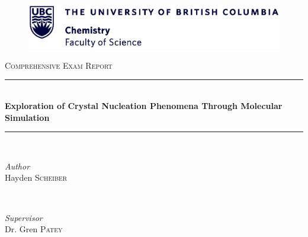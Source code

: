 
\begin{titlepage} %
	\newcommand{\HRule}{\rule{\linewidth}{0.5mm}} %
	
	\center %
	\begin{figure}
		\centering
		\includegraphics[width=\textwidth]{figures/UBC_Chemlogo.eps}
	\end{figure}
	
	
	
	\textsc{\LARGE Comprehensive Exam Report}\\[1.5cm] %
	
	
	
	\HRule\\[0.4cm]
	
	{\huge\bfseries Exploration of Crystal Nucleation Phenomena Through Molecular Simulation}\\[0.4cm] %
	
	\HRule\\[1.5cm]
	
	
	\begin{minipage}{0.4\textwidth}
		\begin{flushleft}
			\large
			\textit{Author}\\
			Hayden \textsc{Scheiber} %
		\end{flushleft}
	\end{minipage}
	~
	\begin{minipage}{0.4\textwidth}
		\begin{flushright}
			\large
			\textit{Supervisor}\\
			Dr. Gren \textsc{Patey} %
		\end{flushright}
	\end{minipage}\\


\end{titlepage}
